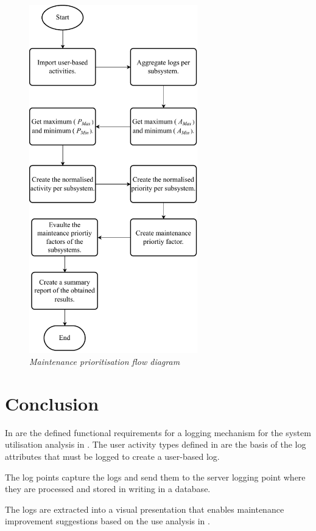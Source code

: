 \begin{figure}[!htb]
	\centering
	\includegraphics[width=0.65\textwidth]{img/Chapter2/maintenancePriortisation/maintenancePriortisation.pdf}
	\caption[Maintenance prioritisation flow diagram]
	{\textit{Maintenance prioritisation flow diagram}}\label{fig:ch2_maintenancePriortisationFlow}
\end{figure}

\clearpage

\section{Conclusion}
In  are the defined functional requirements for a logging mechanism for the system utilisation analysis in . The user activity types defined in  are the basis of the log attributes that must be logged to create a user-based log.\par The log points capture the logs and send them to the server logging point where they are processed and stored in writing in a database.\par The logs are extracted into a visual presentation that enables maintenance improvement suggestions based on the use analysis in .